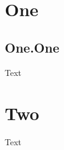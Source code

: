 \documentclass{report}
\begin{document}
\clearpage
{}


\tableofcontents

\chapter{One}
\section{One.One}
Text
\chapter{Two}
Text
\end{document}
